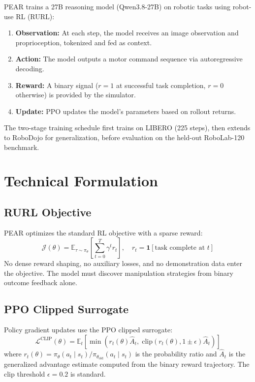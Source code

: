 \documentclass[10pt,twocolumn]{article}
\begin{document}
PEAR trains a 27B reasoning model (Qwen3.8-27B) on robotic tasks using robot-use RL (RURL):
\begin{enumerate}[leftmargin=1.5em,itemsep=2pt]
  \item \textbf{Observation:} At each step, the model receives an image observation and proprioception, tokenized and fed as context.
  \item \textbf{Action:} The model outputs a motor command sequence via autoregressive decoding.
  \item \textbf{Reward:} A binary signal ($r=1$ at successful task completion, $r=0$ otherwise) is provided by the simulator.
  \item \textbf{Update:} PPO updates the model's parameters based on rollout returns.
\end{enumerate}

The two-stage training schedule first trains on LIBERO (225 steps), then extends to RoboDojo for generalization, before evaluation on the held-out RoboLab-120 benchmark.

\section{Technical Formulation}

\subsection*{RURL Objective}

PEAR optimizes the standard RL objective with a sparse reward:
\begin{equation}
\mathcal{J}(\theta) = \mathbb{E}_{\tau \sim \pi_\theta}\!\left[\sum_{t=0}^{T} \gamma^t r_t\right], \quad r_t = \mathbf{1}[\text{task complete at } t]
\label{eq:rurl}
\end{equation}
No dense reward shaping, no auxiliary losses, and no demonstration data enter the objective.
The model must discover manipulation strategies from binary outcome feedback alone.

\subsection*{PPO Clipped Surrogate}

Policy gradient updates use the PPO clipped surrogate:
\begin{equation}
\mathcal{L}^{\text{CLIP}}(\theta) = \mathbb{E}_t\!\left[\min\!\left(r_t(\theta)\hat{A}_t,\; \mathrm{clip}(r_t(\theta),1\pm\epsilon)\hat{A}_t\right)\right]
\label{eq:ppo}
\end{equation}
where $r_t(\theta) = \pi_\theta(a_t \mid s_t) / \pi_{\theta_\text{old}}(a_t \mid s_t)$ is the probability ratio and $\hat{A}_t$ is the generalized advantage estimate computed from the binary reward trajectory.
The clip threshold $\epsilon = 0.2$ is standard.
\end{document}
